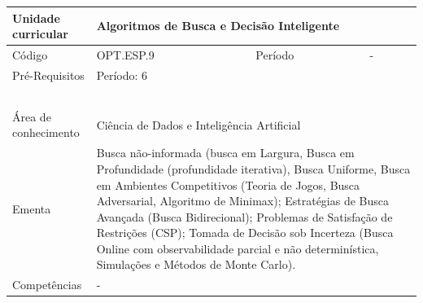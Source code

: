 \clearpage
\newpage

\begin{quadro}[ht!]
  \centering\scriptsize
\caption{Unidade Curricular Algoritmos de Busca e Decisão Inteligente}

\begin{tabular}{|p{2.5cm}|p{2.5cm}|p{2.5cm}|p{2.5cm}|p{2.5cm}|}\hline

  Unidade curricular & \multicolumn{4}{p{10cm}|}{ Algoritmos de Busca e Decisão Inteligente }\\\hline
  Código & OPT.ESP.9 & Período & \multicolumn{2}{p{5cm}|}{ - }\\\hline
  Pré-Requisitos & \multicolumn{4}{p{10cm}|}{ Período: 6 } \\\hline
  \cellcolor{blue1}{ CH PRESENCIAL } &
    \cellcolor{blue1}{CH EAD Síncrona} &
    \cellcolor{blue1}{CH EAD Síncrona Mediada} &
    \cellcolor{blue1}{CH EAD Assíncrona} &
    \cellcolor{blue1}{CH APCC} \\\hline
  \cellcolor{blue1}{ 60 } &
    \cellcolor{blue1}{ 0 } &
    \cellcolor{blue1}{ 30 } &
    \cellcolor{blue1}{ 30 } &
    \cellcolor{blue1}{0} \\\hline
  \cellcolor{blue1}{ CH Teórica } &
    \cellcolor{blue1}{CH Prática} &
    \cellcolor{blue1}{CH Humanidades} &
    \cellcolor{blue1}{CH Extensão} &
    \cellcolor{blue1}{CH EAD TOTAL} \\\hline
  \cellcolor{blue1}{ 30 } &
    \cellcolor{blue1}{ 30 } &
    \cellcolor{blue1}{ 0 } &
    \cellcolor{blue1}{ 0 } &
    \cellcolor{blue1}{ 60 } \\\hline
  \cellcolor{blue1}{CARGA-HORÁRIA TOTAL} & \multicolumn{4}{p{10cm}|}{ \cellcolor{blue1}{ 60 } } \\\hline
  Área de conhecimento & \multicolumn{4}{p{10cm}|}{ Ciência de Dados e Inteligência Artificial } \\\hline
  Ementa & \multicolumn{4}{p{10cm}|}{ Busca não-informada (busca em Largura, Busca em Profundidade (profundidade iterativa), Busca Uniforme, Busca em Ambientes Competitivos (Teoria de Jogos, Busca Adversarial, Algoritmo de Minimax); Estratégias de Busca Avançada (Busca Bidirecional); Problemas de Satisfação de Restrições (CSP); Tomada de Decisão sob Incerteza (Busca Online com observabilidade parcial e não determinística, Simulações e Métodos de Monte Carlo). } \\\hline
  Competências & \multicolumn{4}{p{10cm}|}{ - } \\\hline


  
	\end{tabular}

\end{quadro}


